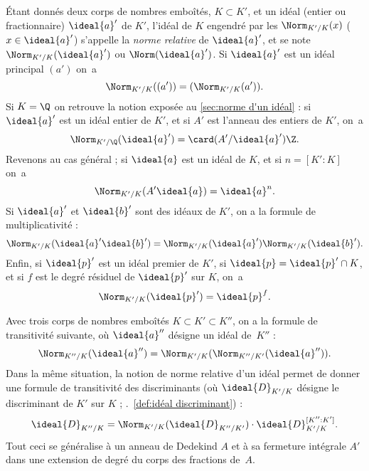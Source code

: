 \documentclass[11pt, useosf,
  title in boldface,
  theorem in new line,
  theorem numbering = section,
  number theorems separately,
]{simplivre}
\begin{document}
    Étant donnés deux corps de nombres emboîtés, \( K \subset K' \), et un idéal (entier ou fractionnaire) \( \ideal{a}' \) de \( K' \), l'idéal de \( K \) engendré par les \( \Norm_{K'/K}(x) \) (\( x \in \ideal{a}' \)) s'appelle la \emph{norme relative} de \( \ideal{a}' \), et se note \( \Norm_{K'/K}(\ideal{a}') \) ou \( \Norm(\ideal{a}') \). Si \( \ideal{a}' \) est un idéal principal \( (a') \) on~a
    \begin{equation}
        \Norm_{K'/K}((a')) = (\Norm_{K'/K}(a')).
    \end{equation}
    Si \( K = \Q \) on retrouve la notion exposée au \cref{sec:norme d'un idéal} : si \( \ideal{a}' \) est un idéal entier de \( K' \), et si \( A' \) est l'anneau des entiers de \( K' \), on~a
    \begin{equation}
        \Norm_{K'/\Q}(\ideal{a}') = \card(A'/\ideal{a}') \Z.
    \end{equation}
    Revenons au cas général ; si \( \ideal{a} \) est un idéal de \( K \), et si \( n = [K':K] \) on~a
    \begin{equation}
        \Norm_{K'/K}(A'\ideal{a}) = \ideal{a}^n.
    \end{equation}
    Si \( \ideal{a}' \) et \( \ideal{b}' \) sont des idéaux de \( K' \), on a la formule de multiplicativité :
    \begin{equation}
        \Norm_{K'/K}(\ideal{a}'\ideal{b}') = \Norm_{K'/K}(\ideal{a}') \Norm_{K'/K}(\ideal{b}').
    \end{equation}
    Enfin, si \( \ideal{p}' \) est un idéal premier de \( K' \), si \( \ideal{p} = \ideal{p}' \cap K \), et si \( f \) est le degré résiduel de \( \ideal{p}' \) sur \( K \), on~a
    \begin{equation}
        \Norm_{K'/K}(\ideal{p}') = \ideal{p}^f.
    \end{equation}

    Avec trois corps de nombres emboîtés \( K \subset K' \subset K'' \), on a la formule de transitivité suivante, où \( \ideal{a}'' \) désigne un idéal de~\( K'' \) :
    \begin{equation}
        \Norm_{K''/K}(\ideal{a}'') = \Norm_{K'/K}(\Norm_{K''/K'}(\ideal{a}'')).
    \end{equation}
    Dans la même situation, la notion de norme relative d'un idéal permet de donner une formule de transitivité des discriminants (où \( \ideal{D}_{K'/K} \) désigne le discriminant de \( K' \) sur \( K \) ; \cf.~\cref{def:idéal discriminant}) :
    \begin{equation}
        \ideal{D}_{K''/K} = \Norm_{K'/K}(\ideal{D}_{K''/K'}) \cdot \ideal{D}_{K'/K}^{[K'':K']}.
    \end{equation}
    Tout ceci se généralise à un anneau de Dedekind \( A \) et à sa fermeture intégrale \( A' \) dans une extension de degré du corps des fractions de~\( A \).
\end{document}

